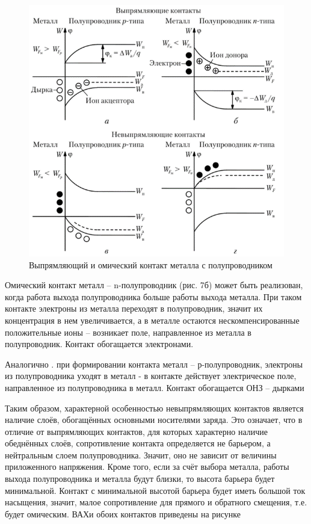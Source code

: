 \documentclass[a4paper,12pt]{article}
\begin{document}
\begin{figure}[h!]
	\begin{center}
	\includegraphics[scale = 0.5]{fig11}
	\caption{Выпрямляющий и омический контакт металла с полупроводником}
	\end{center}
\end{figure}

Омический контакт металл -- n-полупроводник (рис. 7б) может быть реализован, когда работа выхода полупроводника больше работы выхода металла. При таком контакте электроны из металла переходят в полупроводник, значит их концентрация в нем увеличивается, а в металле остаются нескомпенсированные положительные ионы – возникает поле, направленное из металла в полупроводник. Контакт обогащается электронами.

Аналогично . при формировании контакта металл – р-полупроводник, электроны из полупроводника уходят в металл - в контакте действует электрическое поле, направленное из полупроводника в металл. Контакт обогащается ОНЗ – дырками

Таким образом, характерной особенностью невыпрямляющих контактов является наличие слоёв, обогащённых основными носителями заряда. Это означает, что в отличие от выпрямляющих контактов, для которых характерно наличие обеднённых слоёв, сопротивление контакта определяется не барьером, а нейтральным слоем полупроводника. Значит, оно не зависит от величины приложенного напряжения. Кроме того, если за счёт выбора металла, работы выхода полупроводника и металла будут близки, то высота барьера будет минимальной. Контакт с минимальной высотой барьера будет иметь большой ток насыщения, значит, малое сопротивление для прямого и обратного смещения, т.е. будет омическим. ВАХи обоих контактов приведены на рисунке
\end{document}
